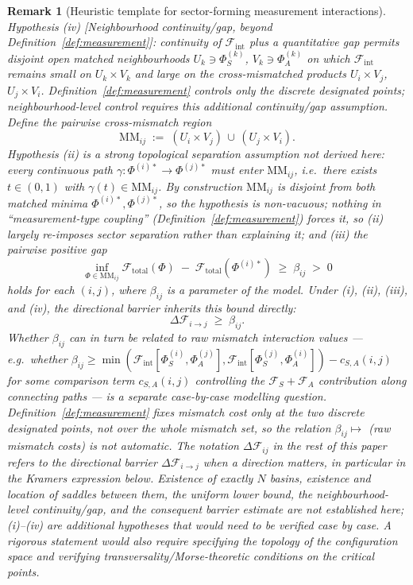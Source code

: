 \documentclass[12pt]{article}
\newtheorem{remark}[theorem]{Remark}
\newcommand{\Fcal}{\mathcal{F}}
\begin{document}
\begin{remark}[Heuristic template for sector-forming measurement interactions]
\emph{Hypothesis (iv) [Neighbourhood continuity/gap, beyond Definition~\ref{def:measurement}]:} continuity of $\Fcal_{\mathrm{int}}$ plus a quantitative gap permits disjoint open matched neighbourhoods $U_k \ni \Phi_S^{(k)}$, $V_k \ni \Phi_A^{(k)}$ on which $\Fcal_{\mathrm{int}}$ remains small on $U_k \times V_k$ and large on the cross-mismatched products $U_i \times V_j$, $U_j \times V_i$. Definition~\ref{def:measurement} controls only the discrete designated points; neighbourhood-level control requires this additional continuity/gap assumption. Define the pairwise cross-mismatch region
\[
    \mathrm{MM}_{ij} \;:=\; (U_i \times V_j) \,\cup\, (U_j \times V_i).
\]
\emph{Hypothesis (ii) is a strong topological separation assumption not derived here:} every continuous path $\gamma: \Phi^{(i)*} \to \Phi^{(j)*}$ must enter $\mathrm{MM}_{ij}$, i.e.\ there exists $t \in (0,1)$ with $\gamma(t) \in \mathrm{MM}_{ij}$. By construction $\mathrm{MM}_{ij}$ is disjoint from both matched minima $\Phi^{(i)*}, \Phi^{(j)*}$, so the hypothesis is non-vacuous; nothing in ``measurement-type coupling'' (Definition~\ref{def:measurement}) forces it, so (ii) largely re-imposes sector separation rather than explaining it; and (iii) the pairwise positive gap
\begin{equation}\label{eq:barrier-hyp}
    \inf_{\Phi \in \mathrm{MM}_{ij}} \Fcal_{\mathrm{total}}(\Phi) \;-\; \Fcal_{\mathrm{total}}(\Phi^{(i)*}) \;\geq\; \beta_{ij} \;>\; 0
\end{equation}
holds for each $(i,j)$, where $\beta_{ij}$ is a parameter of the model. Under (i), (ii), (iii), and (iv), the directional barrier inherits this bound directly:
\begin{equation}\label{eq:barrier}
    \Delta\Fcal_{i\to j} \;\geq\; \beta_{ij}.
\end{equation}
Whether $\beta_{ij}$ can in turn be related to raw mismatch interaction values --- e.g.\ whether $\beta_{ij} \geq \min(\Fcal_{\mathrm{int}}[\Phi_S^{(i)}, \Phi_A^{(j)}], \Fcal_{\mathrm{int}}[\Phi_S^{(j)}, \Phi_A^{(i)}]) - c_{S,A}(i,j)$ for some comparison term $c_{S,A}(i,j)$ controlling the $\Fcal_S + \Fcal_A$ contribution along connecting paths --- is a separate case-by-case modelling question. Definition~\ref{def:measurement} fixes mismatch cost only at the two discrete designated points, not over the whole mismatch set, so the relation $\beta_{ij} \mapsto $ (raw mismatch costs) is not automatic. The notation $\Delta\Fcal_{ij}$ in the rest of this paper refers to the directional barrier $\Delta\Fcal_{i\to j}$ when a direction matters, in particular in the Kramers expression below. Existence of exactly $N$ basins, existence and location of saddles between them, the uniform lower bound, the neighbourhood-level continuity/gap, and the consequent barrier estimate are not established here; (i)--(iv) are additional hypotheses that would need to be verified case by case. A rigorous statement would also require specifying the topology of the configuration space and verifying transversality/Morse-theoretic conditions on the critical points.
\end{remark}
\end{document}
